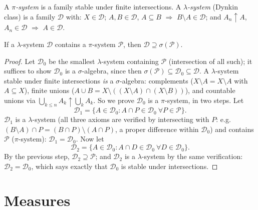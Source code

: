 \begin{definition}\label{def:b3:measure:dynkin}
A \emph{$\pi$-system} is a family
stable under finite intersections. A
\emph{$\lambda$-system}
(Dynkin class) is a family $\mathcal D$ with: $X \in \mathcal
D$; $A, B \in \mathcal D$, $A \subseteq B$ $\Rightarrow$ $B
\setminus A \in \mathcal D$; and $A_n \uparrow A$, $A_n \in
\mathcal D$ $\Rightarrow$ $A \in \mathcal D$.
\end{definition}

\begin{theorem}
\label{thm:b3:measure:dynkin}
If a $\lambda$-system $\mathcal D$ contains a $\pi$-system
$\mathcal P$, then $\mathcal D \supseteq
\sigma(\mathcal P)$.
\end{theorem}

\begin{proof}
Let $\mathcal D_0$ be the smallest $\lambda$-system containing
$\mathcal P$ (intersection of all such); it suffices to show
$\mathcal D_0$ is a $\sigma$-algebra, since then
$\sigma(\mathcal P) \subseteq \mathcal D_0 \subseteq \mathcal
D$. A $\lambda$-system stable under finite intersections
\emph{is} a $\sigma$-algebra: complements ($X \setminus A = X
\setminus A$ with $A \subseteq X$), finite unions ($A \cup B =
X \setminus ((X\setminus A)\cap(X\setminus B))$), and countable
unions via $\bigcup_{k \leq n}A_k \uparrow \bigcup_kA_k$. So we
prove $\mathcal D_0$ is a $\pi$-system, in two steps. Let
\[
\mathcal D_1 = \{A \in \mathcal D_0 : A \cap P \in \mathcal
D_0 \ \forall P \in \mathcal P\}.
\]
$\mathcal D_1$ is a $\lambda$-system (all three axioms are
verified by intersecting with $P$: e.g.\ $(B\setminus A)\cap P
= (B \cap P)\setminus(A \cap P)$, a proper difference within
$\mathcal D_0$) and contains $\mathcal P$ ($\pi$-system):
$\mathcal D_1 = \mathcal D_0$. Now let
\[
\mathcal D_2 = \{A \in \mathcal D_0 : A \cap D \in \mathcal
D_0\ \forall D \in \mathcal D_0\}.
\]
By the previous step, $\mathcal D_2 \supseteq \mathcal P$; and
$\mathcal D_2$ is a $\lambda$-system by the same verification:
$\mathcal D_2 = \mathcal D_0$, which says exactly that
$\mathcal D_0$ is stable under intersections.
\end{proof}

\section{Measures}

